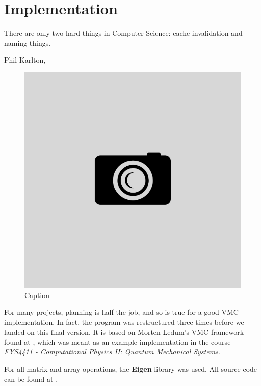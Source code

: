 \chapter{Implementation} \label{sec:implementation}
\epigraph{There are only two hard things in Computer Science: cache invalidation and naming things.}{Phil Karlton, \cite{fowler_bliki:_nodate}}
\begin{figure}[H]
	\centering
	\includegraphics[scale=0.4]{Images/example.png}
	\caption{Caption}
\end{figure}

For many projects, planning is half the job, and so is true for a good VMC implementation. In fact, the program was restructured three times before we landed on this final version. It is based on Morten Ledum's VMC framework found at \cite{ledum_simple_2016}, which was meant as an example implementation in the course \textit{FYS4411 - Computational Physics II: Quantum Mechanical Systems}. 

For all matrix and array operations, the \textbf{Eigen} library was used. All source code can be found at \cite{nordhagen_general_2019}. \bigskip

